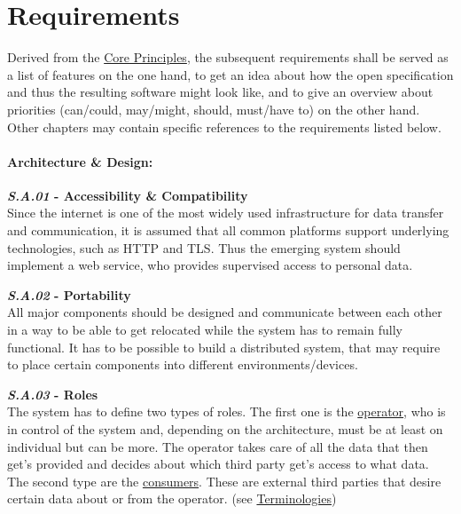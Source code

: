 \documentclass[12pt,english,a4paper,titlepage,cleardoublepage=empty,dottedtoc]{report}
\begin{document}
\hypertarget{requirements}{\chapter{Requirements}\label{requirements}}

Derived from the \protect\hyperlink{core-principles}{Core Principles},
the subsequent requirements shall be served as a list of features on the
one hand, to get an idea about how the open specification and thus the
resulting software might look like, and to give an overview about
priorities (can/could, may/might, should, must/have to) on the other
hand. Other chapters may contain specific references to the requirements
listed below.

\subsubsection{Architecture \& Design:}\label{architecture-design}

\textbf{\emph{\protect\hypertarget{sa01}{}{S.A.01}} - Accessibility \&
Compatibility}\\
Since the internet is one of the most widely used infrastructure for
data transfer and communication, it is assumed that all common platforms
support underlying technologies, such as HTTP and TLS. Thus the emerging
system should implement a web service, who provides supervised access to
personal data.

\textbf{\emph{\protect\hypertarget{sa02}{}{S.A.02}} - Portability}\\
All major components should be designed and communicate between each
other in a way to be able to get relocated while the system has to
remain fully functional. It has to be possible to build a distributed
system, that may require to place certain components into different
environments/devices.

\textbf{\emph{\protect\hypertarget{sa03}{}{S.A.03}} - Roles}\\
The system has to define two types of roles. The first one is the
\protect\hyperlink{terminologies--operator}{operator}, who is in control
of the system and, depending on the architecture, must be at least on
individual but can be more. The operator takes care of all the data that
then get's provided and decides about which third party get's access to
what data. The second type are the
\protect\hyperlink{terminologies--consumer}{consumers}. These are
external third parties that desire certain data about or from the
operator. (see \protect\hyperlink{terminologies}{Terminologies})
\end{document}
